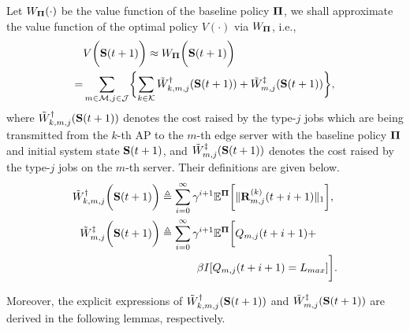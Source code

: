 Let $W_{\boldsymbol{\Pi}}(\cdot)$ be the value function of the baseline policy $\boldsymbol{\Pi}$, we shall approximate the value function of the optimal policy $V(\cdot)$ via $W_{\boldsymbol{\Pi}}$, i.e.,
{\small
\begin{align}
    &V\Paren{\Stat(t+1)} \approx W_{\Baseline}\Paren{\Stat(t+1)}
    \nonumber\\
    =& \sum_{m\in\esSet,j\in\jSpace}\Brace{
        \sum_{k\in\apSet} \tilde{W}^{\AP}_{k,m,j}(\Stat(t+1))
        +\tilde{W}^{\ES}_{m,j}(\Stat(t+1))
    },
    \label{eqn:baseline}
\end{align}
}where $\tilde{W}^{\dagger}_{k,m,j}(\mathbf{S}(t+1))$ denotes the cost raised by the type-$j$ jobs which are being transmitted from the $k$-th AP to the $m$-th edge server with the baseline policy $\boldsymbol{\Pi}$ and initial system state $\mathbf{S}(t+1)$, and $\tilde{W}^{\ddagger}_{m,j}(\mathbf{S}(t+1))$ denotes the cost raised by the type-$j$ jobs on the $m$-th server.
Their definitions are given below.
{\small
\begin{align}
    \tilde{W}^{\dagger}_{k,m,j} \bigg(\mathbf{S}(t+1)\bigg) &\triangleq
        \sum_{i=0}^{\infty} \gamma^{i+1} \mathbb{E}^{\boldsymbol{\Pi}}\bigg[
            \lVert\mathbf{R}^{(k)}_{m,j}(t+i+1)\|_1
        \bigg],
    \\    
    \tilde{W}^{\ddagger}_{m,j} \bigg(\mathbf{S}(t+1)\bigg) &\triangleq
        \sum_{i=0}^{\infty} \gamma^{i+1} \mathbb{E}^{\boldsymbol{\Pi}}\bigg[
            Q_{m,j}(t+i+1) +
            \nonumber\\
            &~~~~~~~~~~\beta I[Q_{m,j}(t+i+1) = L_{max}]
        \bigg].
\end{align}
}

Moreover, the explicit expressions of $\tilde{W}^{\dagger}_{k,m,j}(\mathbf{S}(t+1))$ and $\tilde{W}^{\ddagger}_{m,j}(\mathbf{S}(t+1))$ are derived in the following lemmas, respectively.

